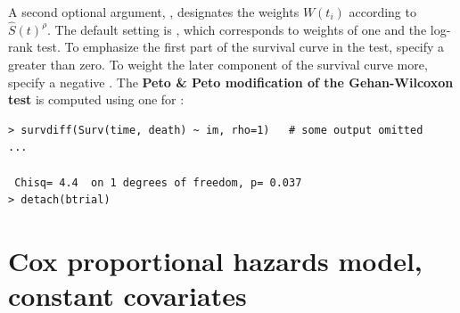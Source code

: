 \documentclass[article]{jss}
\begin{document}
A second optional argument, , designates the weights $W(t_i)$ according to $\hat{S}(t)^\rho$. The default setting is , which corresponds to weights of one and the log-rank test. To emphasize the first part of the survival curve in the test, specify a  greater than zero. To weight the later component of the survival curve more, specify a negative . The \textbf{Peto \& Peto modification of the Gehan-Wilcoxon test} is computed using one for :
\begin{verbatim}
> survdiff(Surv(time, death) ~ im, rho=1)   # some output omitted
...

 Chisq= 4.4  on 1 degrees of freedom, p= 0.037 
> detach(btrial)
\end{verbatim}

\pagebreak

\section[Cox proportional hazards model, constant covariates]{Cox proportional hazards model, constant covariates}
\label{coxPHConstCov}
\end{document}
